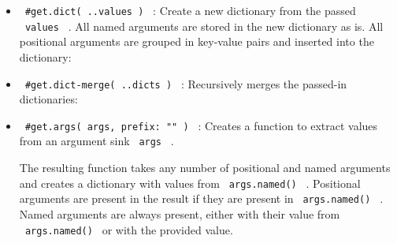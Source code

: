 \begin{itemize}
\item
  \texttt{\ \#get.dict(\ ..values\ )\ } : Create a new dictionary from
  the passed \texttt{\ values\ } . All named arguments are stored in the
  new dictionary as is. All positional arguments are grouped in
  key-value pairs and inserted into the dictionary:

\begin{Shaded}
\begin{Highlighting}[]
\NormalTok{(}\OperatorTok{,} \OperatorTok{,} \OperatorTok{,} \OperatorTok{,} \OperatorTok{,}\OperatorTok{:}\OperatorTok{,}\OperatorTok{:}\NormalTok{)}

\end{Highlighting}
\end{Shaded}
\item
  \texttt{\ \#get.dict-merge(\ ..dicts\ )\ } : Recursively merges the
  passed-in dictionaries:

\begin{Shaded}
\begin{Highlighting}[]
\OperatorTok{{-}}\NormalTok{(}
\OperatorTok{:} \NormalTok{)}\OperatorTok{,}
\OperatorTok{:}\OperatorTok{:} \OperatorTok{,}\OperatorTok{:}\NormalTok{))}\OperatorTok{,}
\OperatorTok{:}\OperatorTok{:} \OperatorTok{,}\OperatorTok{:}\NormalTok{))}
\NormalTok{)}

\end{Highlighting}
\end{Shaded}
\item
  \texttt{\ \#get.args(\ args,\ prefix:\ ""\ )\ } : Creates a function
  to extract values from an argument sink \texttt{\ args\ } .

  The resulting function takes any number of positional and named
  arguments and creates a dictionary with values from
  \texttt{\ args.named()\ } . Positional arguments are present in the
  result if they are present in \texttt{\ args.named()\ } . Named
  arguments are always present, either with their value from
  \texttt{\ args.named()\ } or with the provided value.


\end{itemize}
